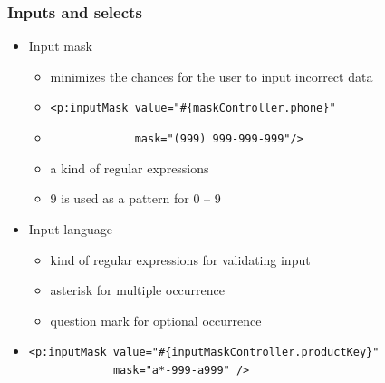 \documentclass[10pt,xcolor=pdflatex]{beamer}
\begin{document}
\begin{frame}[containsverbatim]\frametitle{Inputs and selects}
  \begin{itemize}
    \item Input mask
	  \begin{itemize}
	    \item minimizes the chances for the user to input incorrect data
        \item[] \verb;<p:inputMask value="#{maskController.phone}";
        \item[] \verb;             mask="(999) 999-999-999"/>;
        \item a kind of regular expressions
        \item 9 is used as a pattern for 0 -- 9
      \end{itemize}
    \item Input language
	  \begin{itemize}
	    \item kind of regular expressions for validating input
	    \item asterisk for multiple occurrence
	    \item question mark for optional occurrence
	  \end{itemize}
    \item[] \begin{verbatim}
<p:inputMask value="#{inputMaskController.productKey}" 
             mask="a*-999-a999" />
\end{verbatim}
  \end{itemize}
\end{frame}
\end{document}
